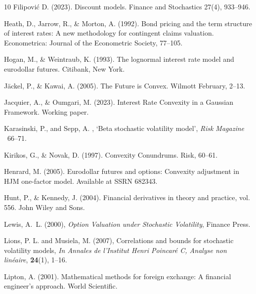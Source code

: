 \documentclass[pdftex,11pt,a4paper] {article}
\begin{document}
\begin{thebibliography}{10}
Filipovi\'{c} D. (2023).  Discount models. Finance and Stochastics 27(4), 933--946.


 Heath, D., Jarrow, R., \& Morton, A. (1992). Bond pricing and the term structure of interest rates: A new methodology for contingent claims valuation. Econometrica: Journal of the Econometric Society, 77--105.

Hogan, M., \& Weintraub, K. (1993). The lognormal interest rate model and eurodollar futures. Citibank, New York.

J\"{a}ckel, P., \& Kawai, A. (2005). The Future is Convex. Wilmott February, 2--13.

Jacquier, A., \& Oumgari, M. (2023). Interest Rate Convexity in a Gaussian Framework. Working paper.


Karasinski, P., and Sepp, A.  \harvardyearright ,
  `Beta stochastic volatility model', {\em Risk Magazine} ~66--71.

 Kirikos, G., \& Novak, D. (1997). Convexity Conundrums. Risk, 60--61.

Henrard, M. (2005). Eurodollar futures and options: Convexity adjustment in HJM one-factor model. Available at SSRN 682343.

Hunt, P., \& Kennedy, J. (2004). Financial derivatives in theory and practice, vol. 556. John Wiley and Sons.


Lewis, A.~L.  (2000), {\em Option Valuation  under Stochastic Volatility}, Finance Press.

Lions, P. L. and Musiela, M.  (2007), Correlations and bounds for stochastic volatility models,  {\em In Annales de l'Institut Henri Poincar\'{e} C, Analyse non lin\'{e}aire}, {\bf 24}(1), 1--16.

 Lipton, A. (2001). Mathematical methods for foreign exchange: A financial engineer's approach. World Scientific.


\end{thebibliography}
\end{document}
